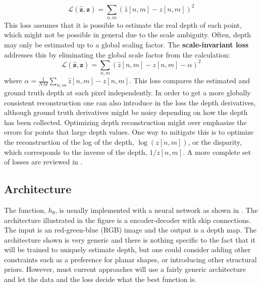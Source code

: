 \begin{equation}
    \mathcal{L} \left( \hat{\mathbf{z}}, \mathbf{z} \right) =  \sum_{n,m} \left( \hat{z}[n,m] - z[n,m] \right) ^2
\end{equation}
This loss assumes that it is possible to estimate the real depth of each point, which might not be possible in general due to the scale ambiguity. Often, depth may only be estimated up to a global scaling factor. The {\bf scale-invariant loss} addresses this by eliminating the global scale factor from the calculation:
\begin{equation}
    \mathcal{L} \left( \hat{\mathbf{z}}, \mathbf{z} \right) =  \sum_{n,m} \left( \hat{z}[n,m] - z[n,m] - \alpha\right) ^2
\end{equation}
where $\alpha = \frac{1}{NM} \sum_{n,m} \hat{z}[n,m] - z[n,m]$. This loss compares the estimated and ground truth depth at each pixel independently. In order to get a more globally consistent reconstruction one can also introduce in the loss the depth derivatives, although ground truth derivatives might be noisy depending on how the depth has been collected. Optimizing depth reconstruction might over emphasize the errors for points that large depth values. One way to mitigate this is to optimize the reconstruction of the log of the depth, $\log \left( z[n,m] \right)$, or the disparity, which corresponds to the inverse of the depth, $1/z[n,m]$.
A more complete set of losses are reviewed in \cite{Ranftl2021,Ranftl2022}.



\subsection{Architecture}



The function, $h_\theta$, is usually implemented with a neural network as shown in \fig{\ref{fig:encoder_decoder_arch_depth}}. The architecture illustrated in the figure is a encoder-decoder with skip connections. The input is an red-green-blue (RGB) image and the output is a depth map. The architecture shown is very generic and there is nothing specific to the fact that it will be trained to uniquely estimate depth, but one could consider adding other constraints such as a preference for planar shapes, or introducing other structural priors. However, must current approaches will use a fairly generic architecture and let the data and the loss decide what the best function is.

